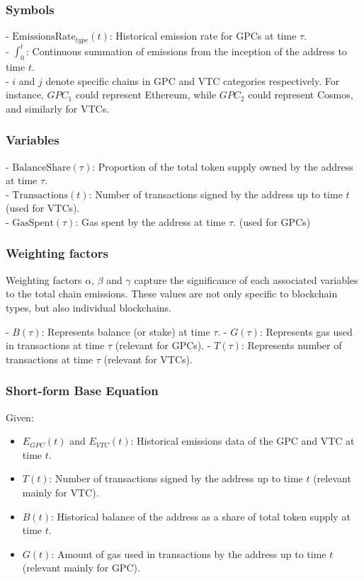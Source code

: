 \documentclass[12pt,a4paper]{report}
\begin{document}
\subsubsection*{Symbols}
- \(\text{EmissionsRate}_{type}(t)\): Historical emission rate for GPCs at time \(\tau\). \\
- \( \int_{0}^{t} \): Continuous summation of emissions from the inception of the address to time \(t\). \\
- \( i \) and \( j \) denote specific chains in GPC and VTC categories respectively. For instance, \( GPC_1 \) could represent Ethereum, while \( GPC_2 \) could represent Cosmos, and similarly for VTCs.

\subsubsection*{Variables}
- \(\text{BalanceShare}(\tau)\): Proportion of the total token supply owned by the address at time \(\tau\). \\
- \(\text{Transactions}(t)\): Number of transactions signed by the address up to time $t$ (used for VTCs). \\
- \(\text{GasSpent}(\tau)\): Gas spent by the address at time \(\tau\). (used for GPCs)
\subsubsection*{Weighting factors}

Weighting factors $\alpha$, $\beta$ and $\gamma$ capture the significance of each associated variables to the total
chain emissions. These values are not only specific to blockchain types, but also individual blockchains. \newline

- \( B(\tau) \): Represents balance (or stake) at time \( \tau \). \newline
- \( G(\tau) \): Represents gas used in transactions at time \( \tau \) (relevant for GPCs). \newline
- \( T(\tau) \): Represents number of transactions at time \( \tau \) (relevant for VTCs). \newline

\subsubsection{Short-form Base Equation}
Given:
\begin{itemize}
    \item $E_{GPC}(t)$ and $E_{VTC}(t)$: Historical emissions data of the GPC and VTC at time $t$.
    \item $T(t)$: Number of transactions signed by the address up to time $t$ (relevant mainly for VTC).
    \item $B(t)$: Historical balance of the address as a share of total token supply at time $t$.
    \item $G(t)$: Amount of gas used in transactions by the address up to time $t$ (relevant mainly for GPC).
\end{itemize}
\end{document}
